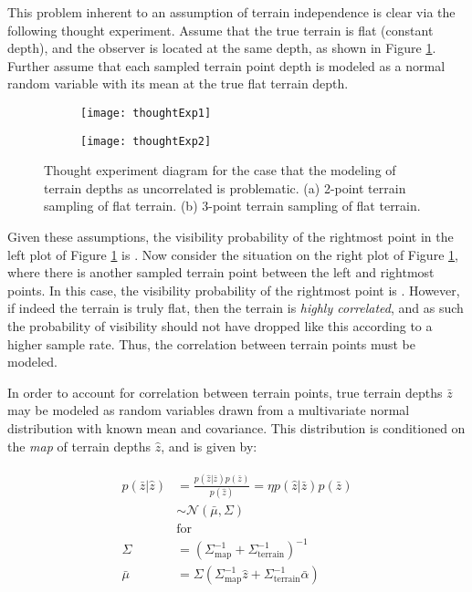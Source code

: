 This problem inherent to an assumption of terrain independence is clear via the following thought experiment.  Assume that the true terrain is flat (constant depth), and the observer is located at the same depth, as shown in Figure \ref{fig:thoughtExp}. Further assume that each sampled terrain point depth is modeled as a normal random variable with its mean at the true flat terrain depth. 

\begin{figure}[!h]
	\centering
	\begin{subfigure}[b]{0.4\textwidth}
                \texttt{[image: thoughtExp1]}
                \caption{}
  \end{subfigure}
  \hspace{10ex}
  \centering
	\begin{subfigure}[b]{0.4\textwidth}
                \texttt{[image: thoughtExp2]}
                \caption{}
  \end{subfigure}
	\caption{\small Thought experiment diagram for the case that the modeling of terrain depths as uncorrelated is problematic.  (a) 2-point terrain sampling of flat terrain. (b) 3-point terrain sampling of flat terrain.}	
	\label{fig:thoughtExp}
\end{figure}

\noindent  Given these assumptions, the visibility probability of the rightmost point in the left plot of Figure \ref{fig:thoughtExp} is .  Now consider the situation on the right plot of Figure \ref{fig:thoughtExp}, where there is another sampled terrain point between the left and rightmost points.  In this case, the visibility probability of the rightmost point is .  However, if indeed the terrain is truly flat, then the terrain is \emph{highly correlated}, and as such the probability of visibility should not have dropped like this according to a higher sample rate. Thus, the correlation between terrain points must be modeled.

In order to account for correlation between terrain points, true terrain depths $\bar{z}$ may be modeled as random variables drawn from a multivariate normal distribution with known mean and covariance.  This distribution is conditioned on the \emph{map} of terrain depths $\hat{z}$, and is given by:

\begin{align}
\begin{split}
p(\bar{z} | \hat{z}) &= \frac{p(\hat{z}|\bar{z})p(\bar{z})}{p(\hat{z})} = \eta p(\hat{z}|\bar{z})p(\bar{z}) \\
 &\sim \mathcal{N}(\bar{\mu}, \Sigma) \\
&\text{for}  \\
\Sigma &= (\Sigma_{\text{map}}^{-1} + \Sigma_{\text{terrain}}^{-1})^{-1} \\
\bar{\mu} &= \Sigma(\Sigma_{\text{map}}^{-1}\hat{z} + \Sigma_{\text{terrain}}^{-1}\bar{\alpha})
\label{eq:terrainMeanCov}
\end{split}
\end{align}


